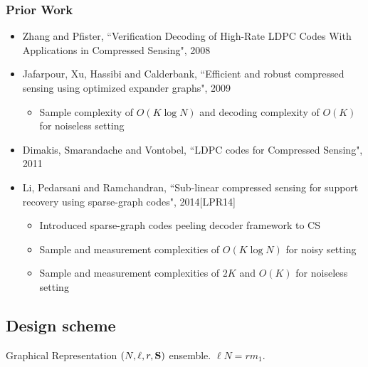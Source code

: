 \begin{frame}\frametitle{Prior Work}
\begin{itemize}
\item Zhang and Pfister, ``Verification Decoding of High-Rate LDPC Codes With Applications in Compressed Sensing", 2008
\item  Jafarpour, Xu, Hassibi and Calderbank, ``Efficient and robust compressed sensing using optimized expander graphs", 2009
\begin{itemize}
\item Sample complexity of $O(K\log N)$ and decoding complexity of $O(K)$ for noiseless setting
\end{itemize}
\item Dimakis, Smarandache and Vontobel, ``LDPC codes for Compressed Sensing", 2011

\vspace{3ex}
\item Li, Pedarsani and Ramchandran, ``Sub-linear compressed sensing for support recovery using sparse-graph codes", 2014[LPR14]
\begin{itemize}
\item Introduced sparse-graph codes peeling decoder framework to CS
\item Sample and measurement complexities of $O(K\log N)$ for noisy setting
\item Sample and measurement complexities of $2K$ and $O(K)$ for noiseless setting
\end{itemize}
\end{itemize}
\end{frame}

\subsection{Design scheme}
\begin{frame}{Graphical Representation}
$(N,\ell,r,\mathbf{S})$ ensemble. $\ell N=rm_1$. 
\begin{figure}
\scalebox{1.3}{}
\end{figure}
\end{frame}

